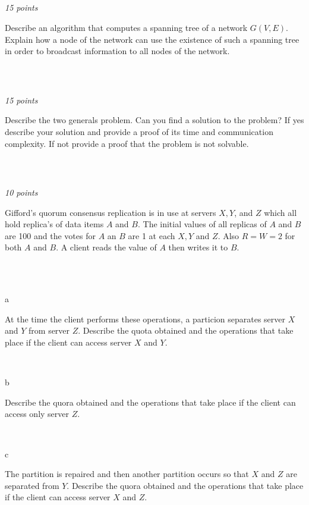 \documentclass[a4paper]{article}
\newcommand{\points}[1]{\subsection{} \textit{#1 points}\\}
\newcommand{\question}[2][]{
  \noindent
  \parbox[t]{\textwidth}{#1 \parbox[t]{0.95\textwidth}{#2}}\\
}
\begin{document}
\points{15}
\question{Describe an algorithm that computes a spanning
  tree of a network $G(V,E)$. Explain how a node of the network can use
  the existence of such a spanning tree in order to broadcast
  information to all nodes of the network.}

\points{15}
\question{Describe the two generals problem. Can you find
  a solution to the problem? If yes describe your solution and provide a
  proof of its time and communication complexity. If not provide a proof
  that the problem is not solvable. }

\points{10}
\question{Gifford's quorum consensus replication is in use
  at servers $X, Y$, and $Z$ which all hold replica's of data items $A$
  and $B$. The initial values of all replicas of $A$ and $B$ are 100 and
  the votes for $A$ an $B$ are 1 at each $X, Y$ and $Z$. Also $R=W=2$
  for both $A$ and $B$. A client reads the value of $A$ then writes it
  to $B$.}\\
\question[a]{At the time the client performs these
  operations, a particion separates server $X$ and $Y$ from server
  $Z$. Describe the quota obtained and the operations that take place if
  the client can access server $X$ and $Y$.}
\question[b]{Describe the quora obtained and the operations that take
  place if the client can access only server $Z$.}
\question[c]{The partition is repaired and then another partition
  occurs so that $X$ and $Z$ are separated from $Y$. Describe the
  quora obtained and the operations that take place if the client can
  access server $X$ and $Z$.}
\end{document}
